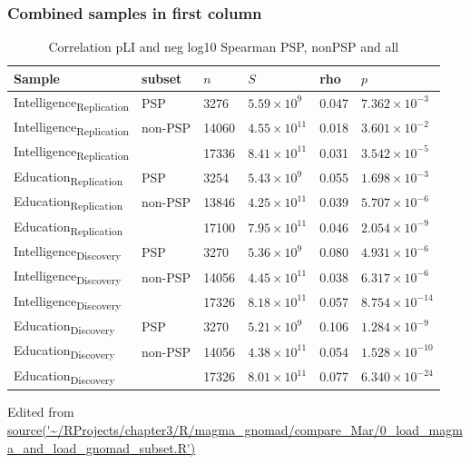 \subsubsection{Combined samples in first column}
\begin{table}[ht]
\centering
\setlength{\extrarowheight}{2pt}
\begin{tabular}{llllll}
  \toprule
Sample & subset & $n$ &$S$ & rho & $p$ \\ 
  \midrule
Intelligence\textsubscript{Replication} & PSP & 3276 & $5.59 \times 10^{9}$ & 0.047 & $7.362 \times 10^{-3}$ \\ 
Intelligence\textsubscript{Replication} & non-PSP & 14060 & $4.55 \times 10^{11}$ & 0.018 & $3.601 \times 10^{-2}$ \\ 
 Intelligence\textsubscript{Replication} &  & 17336 & $8.41 \times 10^{11}$ & 0.031 & $3.542 \times 10^{-5}$  \vspace{9pt}\\ 

  Education\textsubscript{Replication} & PSP & 3254 & $5.43 \times 10^{9}$ & 0.055 & $1.698 \times 10^{-3}$ \\ 
  Education\textsubscript{Replication} & non-PSP & 13846 & $4.25 \times 10^{11}$ & 0.039 & $5.707 \times 10^{-6}$ \\ 
  Education\textsubscript{Replication} &  & 17100 & $7.95 \times 10^{11}$ & 0.046 & $2.054 \times 10^{-9}$\vspace{9pt} \\ 
  
  Intelligence\textsubscript{Discovery} & PSP & 3270 & $5.36 \times 10^{9}$ & 0.080 & $4.931 \times 10^{-6}$ \\ 
  Intelligence\textsubscript{Discovery} & non-PSP & 14056 & $4.45 \times 10^{11}$ & 0.038 & $6.317 \times 10^{-6}$ \\ 
   Intelligence\textsubscript{Discovery} &  & 17326 & $8.18 \times 10^{11}$ & 0.057 & $8.754 \times 10^{-14}$ \vspace{9pt}\\ 
  
  Education\textsubscript{Discovery} & PSP & 3270 & $5.21 \times 10^{9}$ & 0.106 & $1.284 \times 10^{-9}$ \\ 
  Education\textsubscript{Discovery} & non-PSP & 14056 & $4.38 \times 10^{11}$ & 0.054 & $1.528 \times 10^{-10}$ \\ 
  Education\textsubscript{Discovery} &  & 17326 & $8.01 \times 10^{11}$ & 0.077 & $6.340 \times 10^{-24}$ \\ 
   \bottomrule
\end{tabular}
\caption{Correlation pLI and neg log10 Spearman PSP, nonPSP and all} 
\tiny Edited from \url{source('~/RProjects/chapter3/R/magma_gnomad/compare_Mar/0_load_magma_and_load_gnomad_subset.R')} 
\label{tab: Correlation pLI and neg log10 SpearmanPSP, nonPSP and all1}
\end{table}


